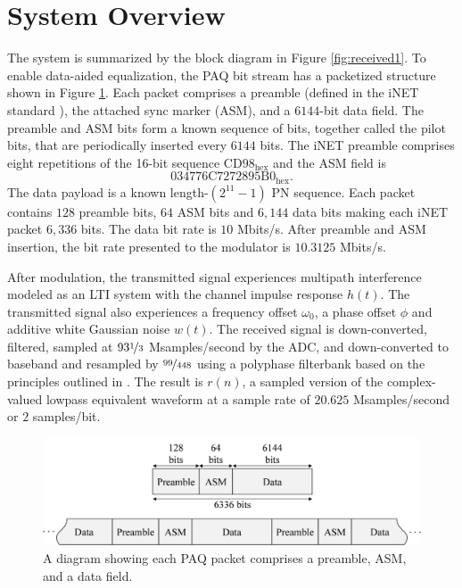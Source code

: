 \section{System Overview}
The system is summarized by the block diagram in Figure \ref{fig:received1}.
To enable data-aided equalization, the PAQ bit stream has a packetized structure shown in Figure \ref{fig:packetStructure_intro}. 
Each packet comprises a preamble (defined in the iNET standard \cite{inet-ran:2012}), 
the attached sync marker (ASM), and a $6144$-bit data field. The preamble and ASM bits
form a known sequence of bits, together called the pilot bits, that are periodically inserted every $6144$ bits.
The iNET preamble comprises eight repetitions of the 16-bit sequence $\text{CD98}_\text{hex}$ and the ASM field is
\begin{equation}
\text{034776C7272895B0}_\text{hex}.
\end{equation}
The data payload is a known length-$(2^{11} - 1)$ PN sequence.
Each packet contains $128$ preamble bits, $64$ ASM bits and $6{,}144$ data bits making each iNET packet $6{,}336$ bits.
The data bit rate is $10$ Mbits/s. 
After preamble and ASM insertion, the bit rate presented to the modulator is $10.3125$ Mbits/s.

After modulation, the transmitted signal experiences multipath interference modeled as an LTI system with the channel impulse response $h(t)$.
The transmitted signal also experiences a frequency offset $\omega_0$, a phase offset $\phi$ and additive white Gaussian noise $w(t)$.
The received signal is down-converted, filtered, sampled at $93\nicefrac{1}{3}$ Msamples/second by the ADC, and down-converted to baseband and resampled by $\nicefrac{99}{448}$ using a polyphase filterbank based on the principles outlined in \cite[chap. (9)]{rice:2009}.
The result is $r(n)$, a sampled version of the complex-valued lowpass equivalent waveform at a sample rate of $20.625$ Msamples/second or $2$ samples/bit.
\begin{figure}
	\centering\includegraphics[width=9.47in/100*55]{figures/intro/packetSturcture.pdf}
	\caption{A diagram showing each PAQ packet comprises a preamble, ASM, and a data field.}
	\label{fig:packetStructure_intro}
\end{figure}

